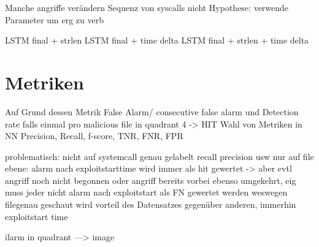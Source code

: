             Manche angriffe verändern Sequenz von syscalls nicht
            Hypothese:
            verwende Parameter um erg zu verb

            LSTM final + strlen
            LSTM final + time delta
            LSTM final + strlen + time delta



\section{Metriken}\label{sec:Metriken}

    Auf Grund dessen Metrik False Alarm/ consecutive false alarm und Detection rate falls einmal pro malicious file in quadrant 4 -> HIT
    Wahl von Metriken in NN
    Precision, Recall, f-score, TNR, FNR, FPR

    problematisch:
    nicht auf systemcall genau gelabelt
    recall precision usw nur auf file ebene:
    alarm nach exploitstarttime wird immer als hit gewertet -> aber evtl angriff noch nicht begonnen
    oder angriff bereits vorbei
    ebenso umgekehrt, eig muss jeder nicht alarm nach exploitstart als FN gewertet werden
    weswegen filegenau geschaut wird
    vorteil des Datensatzes gegenüber anderen, immerhin exploitstart time

    ilarm in quadrant ---> image

